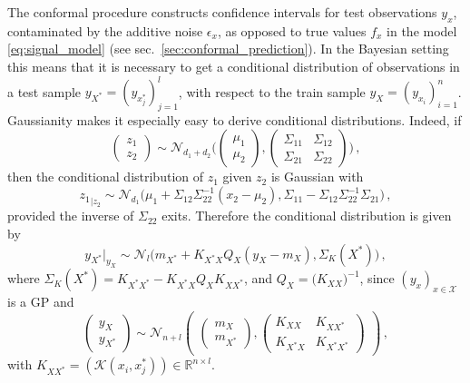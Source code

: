 \documentclass{ITaSconf}
\newcommand{\Ncal}{\mathcal{N}}
\newcommand{\Kcal}{\mathcal{K}}
\newcommand{\Xcal}{\mathcal{X}}
\newcommand{\Real}{\mathbb{R}}
\begin{document}
The conformal procedure constructs confidence intervals for test observations $y_x$,
contaminated by the additive noise $\epsilon_x$, as opposed to true values $f_x$ in
the model \ref{eq:signal_model} (see sec.~\ref{sec:conformal_prediction}). In the
Bayesian setting this means that it is necessary to get a conditional distribution
of observations in a test sample $y_{X^*} = (y_{x^*_j})_{j=1}^l$, with respect to
the train sample $y_X = (y_{x_i})_{i=1}^n$. Gaussianity makes it especially easy
to derive conditional distributions. Indeed, if
\begin{equation*}
  \begin{pmatrix}z_1 \\ z_2\end{pmatrix}
    \sim \Ncal_{d_1+d_2}\Biggl(
      \begin{pmatrix} \mu_1 \\ \mu_2 \end{pmatrix},
      \begin{pmatrix}
        \Sigma_{11} & \Sigma_{12} \\
        \Sigma_{21} & \Sigma_{22}
      \end{pmatrix}
    \Biggr)
    \,,
\end{equation*}
then the conditional distribution of $z_1$ given $z_2$ is Gaussian with
\begin{equation*}
  {z_1}_{|z_2}
    \sim \Ncal_{d_1}\bigl(
      \mu_1 + \Sigma_{12}\Sigma_{22}^{-1}(x_2-\mu_2),
      \Sigma_{11} - \Sigma_{12}\Sigma_{22}^{-1}\Sigma_{21}
    \bigr)
    \,,
\end{equation*}
provided the inverse of $\Sigma_{22}$ exits. Therefore the conditional distribution
is given by
\begin{equation} \label{eq:cond_distr}
  y_{X^*}\vert_{y_X}
    \sim \Ncal_l\bigl(
      m_{X^*} + K_{X^*X} Q_X (y_X - m_X),
      \Sigma_K(X^*)
    \bigr)
    \,,
\end{equation}
where $\Sigma_K(X^*) = K_{X^*X^*} - K_{X^*X} Q_X K_{XX^*}$, and
$Q_X = \bigl(K_{XX}\bigr)^{-1}$, since $(y_x)_{x\in\Xcal}$ is a GP and
\begin{equation*}
  \begin{pmatrix} y_X \\ y_{X^*} \end{pmatrix}
    \sim \Ncal_{n+l}\begin{pmatrix}
      \begin{pmatrix} m_X \\ m_{X^*} \end{pmatrix},
      \begin{pmatrix}
        K_{XX} & K_{XX^*} \\
        K_{X^*X} & K_{X^*X^*}
      \end{pmatrix}
    \end{pmatrix}
    \,,
\end{equation*}
with $K_{XX^*} = (\Kcal(x_i, x^*_j))\in \Real^{n\times l}$.
\end{document}

